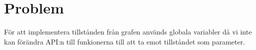 \section{Problem}
För att implementera tillstånden från grafen används globala variabler då vi inte kan förändra API:n till funkionerna till att ta emot tillståndet som parameter.
